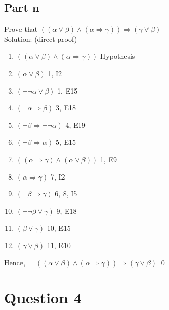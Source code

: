 \documentclass{article}
\begin{document}
		\subsection{Part n}
			Prove that $((\alpha \lor \beta) \land (\alpha \Rightarrow \gamma)) \Rightarrow (\gamma \lor \beta)$ \\
			Solution: (direct proof) \\
			\begin{enumerate}
				\item $((\alpha \lor \beta) \land (\alpha \Rightarrow \gamma))$     \hfill Hypothesis 
				\item $(\alpha \lor \beta)$ 										\hfill 1, I2 
				\item $(\lnot\lnot\alpha \lor \beta)$								\hfill 1, E15
				\item $(\lnot\alpha \Rightarrow \beta)$                             \hfill 3, E18 
				\item $(\lnot\beta \Rightarrow \lnot\lnot\alpha)$                   \hfill 4, E19 
				\item $(\lnot\beta \Rightarrow \alpha)$                             \hfill 5, E15 
				\item $((\alpha \Rightarrow \gamma) \land (\alpha \lor \beta))$     \hfill 1, E9 
				\item $(\alpha \Rightarrow \gamma)$                                 \hfill 7, I2 
				\item $(\lnot\beta \Rightarrow \gamma)$                             \hfill 6, 8, I5 
				\item $(\lnot\lnot\beta \lor \gamma)$                              	\hfill 9, E18 
				\item $(\beta \lor \gamma)$                                       	\hfill 10, E15 
				\item $(\gamma \lor \beta)$                                       	\hfill 11, E10 
			\end{enumerate}
			Hence, $\vdash$$((\alpha \lor \beta) \land (\alpha \Rightarrow \gamma)) \Rightarrow (\gamma \lor \beta)$ \hfill \qed 	
	\section{Question 4}
\end{document}

